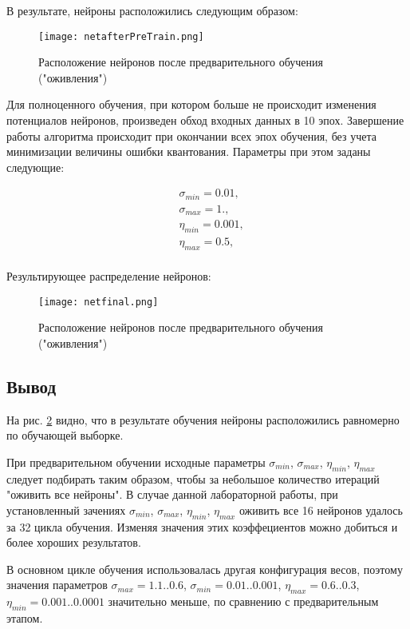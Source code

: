 В результате, нейроны расположились следующим образом:

\begin{figure}[H]
\centering
\texttt{[image: netafterPreTrain.png]}
\caption{Расположение нейронов после предварительного обучения ("оживления")}
\label{img:afterPreTrain}
\end{figure}

Для полноценного обучения, при котором больше не происходит изменения потенциалов нейронов, произведен обход входных данных в 10 эпох. Завершение работы алгоритма происходит при окончании всех эпох обучения, без учета минимизации величины ошибки квантования.
Параметры при этом заданы следующие:

\begin{equation}
	\begin{aligned}
	 &	\sigma_{min} = 0.01,  \\ 
	 &	\sigma_{max} = 1., \\	
	 &	\eta_{min} = 0.001,  \\ 
	 &	\eta_{max} = 0.5, \\
	\end{aligned}
\end{equation}

Результирующее распределение нейронов:

\begin{figure}[H]
\centering
\texttt{[image: netfinal.png]}
\caption{Расположение нейронов после предварительного обучения ("оживления")}
\label{img:finalpos}
\end{figure}



\subsection{Вывод}

На рис. \ref{img:finalpos} видно, что в результате обучения нейроны расположились равномерно по обучающей выборке.

При предварительном обучении исходные параметры $\sigma_{min}$, $\sigma_{max}$, $\eta_{min}$, $\eta_{max}$ следует подбирать таким образом, чтобы за небольшое количество итераций "оживить все нейроны". В случае данной лабораторной работы, при установленный зачениях $\sigma_{min}$, $\sigma_{max}$, $\eta_{min}$, $\eta_{max}$ оживить все 16 нейронов удалось за 32 цикла обучения. Изменяя значения этих коэффециентов можно добиться и более хороших результатов.

В основном цикле обучения использовалась другая конфигурация весов, поэтому значения параметров $\sigma_{max} = 1.1 .. 0.6 $,  $\sigma_{min} = 0.01 .. 0.001$, $\eta_{max} = 0.6 .. 0.3$, $\eta_{min} = 0.001 .. 0.0001$ значительно меньше, по сравнению с предварительным этапом.

